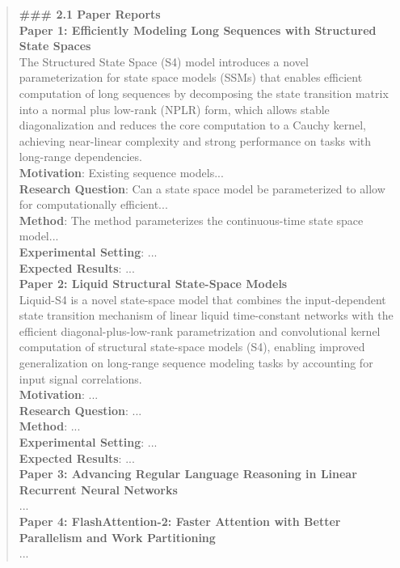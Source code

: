 \begin{quote}
\begin{tcolorbox}[breakable,colback=almond!20!white, colframe=almond!60!black, title=\textbf{Case Study (Mamba: Linear-Time Sequence Modeling with Selective State Spaces)}]
        \textbf{\#\#\# 2.1 Paper Reports}\\
        
        \textbf{Paper 1: Efficiently Modeling Long Sequences with Structured State Spaces}\\
        The Structured State Space (S4) model introduces a novel parameterization for state space models (SSMs) that enables efficient computation of long sequences by decomposing the state transition matrix into a normal plus low-rank (NPLR) form, which allows stable diagonalization and reduces the core computation to a Cauchy kernel, achieving near-linear complexity and strong performance on tasks with long-range dependencies.\\
        \textbf{Motivation}: Existing sequence models...\\
        \textbf{Research Question}: Can a state space model be parameterized to allow for computationally efficient...\\
        \textbf{Method}: The method parameterizes the continuous-time state space model...\\
        \textbf{Experimental Setting}: ...\\
        \textbf{Expected Results}: ...\\

        \textbf{Paper 2: Liquid Structural State-Space Models}\\
        Liquid-S4 is a novel state-space model that combines the input-dependent state transition mechanism of linear liquid time-constant networks with the efficient diagonal-plus-low-rank parametrization and convolutional kernel computation of structural state-space models (S4), enabling improved generalization on long-range sequence modeling tasks by accounting for input signal correlations.\\
        \textbf{Motivation}: ...\\
        \textbf{Research Question}: ...\\
        \textbf{Method}: ...\\
        \textbf{Experimental Setting}: ...\\
        \textbf{Expected Results}: ...\\

        \textbf{Paper 3: Advancing Regular Language Reasoning in Linear Recurrent Neural Networks}\\
        ...\\

        \textbf{Paper 4: FlashAttention-2: Faster Attention with Better Parallelism and Work Partitioning}\\
        ...\\


\end{tcolorbox}
\end{quote}

